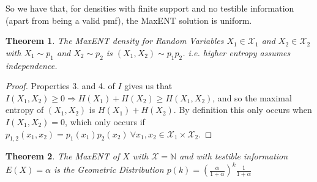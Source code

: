 \documentclass[]{article}
\theoremstyle{mattstyle}
\newtheorem{theorem}{Theorem}[section]
\theoremstyle{definition}
\begin{document}
So we have that, for densities with finite support and no testible information (apart from being a valid pmf), the MaxENT solution is uniform.


\begin{theorem}
	The MaxENT density for Random Variables $X_1 \in \mathcal{X}_1$ and $X_2 \in \mathcal{X}_2$ with $X_1 \sim p_1$ and $X_2 \sim p_2$ is \( (X_1,X_2)\sim p_1p_2 \). i.e. higher entropy assumes independence.
\end{theorem}

\begin{proof}
	Properties 3. and 4. of $I$ gives us that \(I(X_1,X_2)\ge0 \Rightarrow H(X_1) + H(X_2) \ge H(X_1,X_2) \), and so the maximal entropy of \((X_1,X_2)\) is \(H(X_1) + H(X_2)\). By definition this only occurs when \(I(X_1,X_2)=0\), which only occurs if
	\(p_{1,2}(x_1,x_2)=p_1(x_1)p_2(x_2) \ \forall x_1,x_2 \in \mathcal{X}_1\times\mathcal{X}_2\).
\end{proof}

\begin{theorem}
	The MaxENT of $X$ with $\mathcal{X} = \mathbb{N}$ and with testible information $E(X)=\alpha$ is the Geometric Distribution $p(k)=\left(\frac{\alpha}{1+\alpha}\right)^k \frac{1}{1+\alpha}$
\end{theorem}
\end{document}
